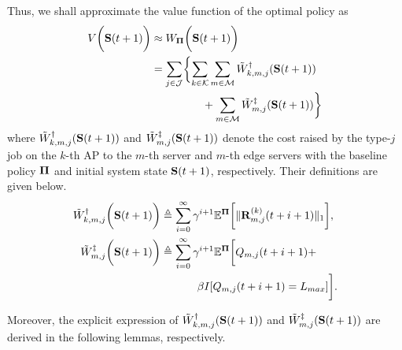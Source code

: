 Thus, we shall approximate the value function of the optimal policy as
\begin{align}
    V\Paren{\Stat(t+1)} &\approx W_{\Baseline}\Paren{\Stat(t+1)}
    \nonumber\\
    &= \sum_{j\in\jSpace}\Brace{
        \sum_{k\in\apSet}\sum_{m\in\esSet} \tilde{W}^{\AP}_{k,m,j}(\Stat(t+1))
        \nonumber\\
        &~~~~~~~~~~~~~~+\sum_{m\in\esSet} \tilde{W}^{\ES}_{m,j}(\Stat(t+1))
    }
\end{align}
where $\tilde{W}^{\dagger}_{k,m,j}(\mathbf{S}(t+1))$ and $\tilde{W}^{\ddagger}_{m,j}(\mathbf{S}(t+1))$ denote the cost raised by the type-$j$ job on the $k$-th AP to the $m$-th server and $m$-th edge servers with the baseline policy $\boldsymbol{\Pi}$ and initial system state $\mathbf{S}(t+1)$, respectively.
Their definitions are given below.
{\small
\begin{align}
    \tilde{W}^{\dagger}_{k,m,j} \bigg(\mathbf{S}(t+1)\bigg) &\triangleq
        \sum_{i=0}^{\infty} \gamma^{i+1} \mathbb{E}^{\boldsymbol{\Pi}}\bigg[
            \lVert\mathbf{R}^{(k)}_{m,j}(t+i+1)\|_1
        \bigg],
    \\    
    \tilde{W}^{\ddagger}_{m,j} \bigg(\mathbf{S}(t+1)\bigg) &\triangleq
        \sum_{i=0}^{\infty} \gamma^{i+1} \mathbb{E}^{\boldsymbol{\Pi}}\bigg[
            Q_{m,j}(t+i+1) +
            \nonumber\\
            &~~~~~~~~~~\beta I[Q_{m,j}(t+i+1) = L_{max}]
        \bigg].
\end{align}
}

Moreover, the explicit expression of $\tilde{W}^{\dagger}_{k,m,j}(\mathbf{S}(t+1))$ and $\tilde{W}^{\ddagger}_{m,j}(\mathbf{S}(t+1))$ are derived in the following lemmas, respectively.

